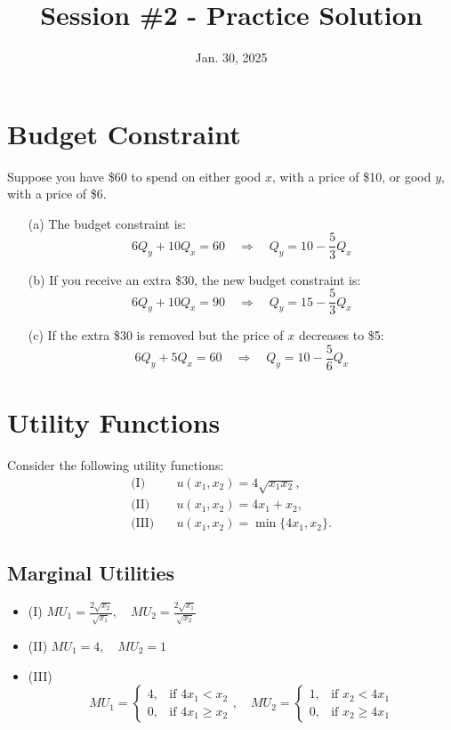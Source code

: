 \documentclass[a4paper,12pt]{article}
\begin{document}
\title{Session \#2 - Practice Solution}
\author{Jan. 30, 2025}
\date{}
\maketitle

\section{Budget Constraint}

Suppose you have \$60 to spend on either good $x$, with a price of \$10, or good $y$, with a price of \$6.

\begin{enumerate}
    \item[(a)] The budget constraint is:
    \[
    6Q_y + 10Q_x = 60 \quad \Rightarrow \quad Q_y = 10 - \frac{5}{3}Q_x
    \]

    \item[(b)] If you receive an extra \$30, the new budget constraint is:
    \[
    6Q_y + 10Q_x = 90 \quad \Rightarrow \quad Q_y = 15 - \frac{5}{3}Q_x
    \]

    \item[(c)] If the extra \$30 is removed but the price of $x$ decreases to \$5:
    \[
    6Q_y + 5Q_x = 60 \quad \Rightarrow \quad Q_y = 10 - \frac{5}{6}Q_x
    \]
\end{enumerate}

\section{Utility Functions}

Consider the following utility functions:
\begin{align*}
    \text{(I)} & \quad u(x_1, x_2) = 4\sqrt{x_1 x_2}, \\
    \text{(II)} & \quad u(x_1, x_2) = 4x_1 + x_2, \\
    \text{(III)} & \quad u(x_1, x_2) = \min\{4x_1, x_2\}.
\end{align*}

\subsection{Marginal Utilities}

\begin{itemize}
    \item (I) \quad $MU_1 = \frac{2\sqrt{x_2}}{\sqrt{x_1}}, \quad MU_2 = \frac{2\sqrt{x_1}}{\sqrt{x_2}}$
    \item (II) \quad $MU_1 = 4, \quad MU_2 = 1$
    \item (III) \quad
    \[
    MU_1 =
    \begin{cases}
    4, & \text{if } 4x_1 < x_2 \\
    0, & \text{if } 4x_1 \geq x_2
    \end{cases}, \quad
    MU_2 =
    \begin{cases}
    1, & \text{if } x_2 < 4x_1 \\
    0, & \text{if } x_2 \geq 4x_1
    \end{cases}
    \]
\end{itemize}
\end{document}
